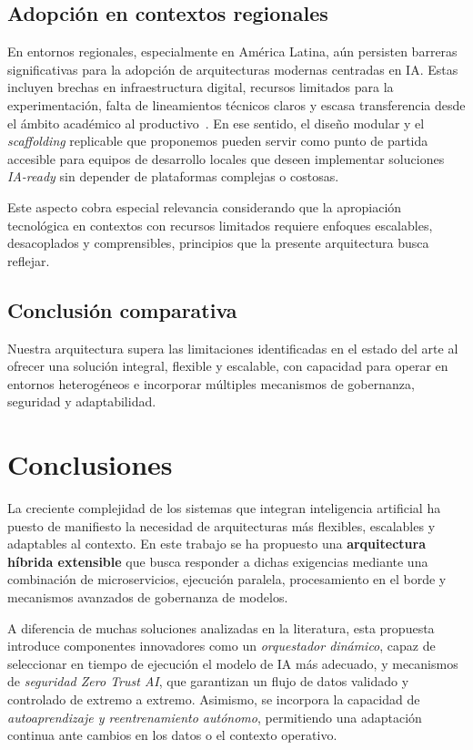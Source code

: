 \documentclass[a4paper]{llncs}
\begin{document}
\subsection{Adopción en contextos regionales}

En entornos regionales, especialmente en América Latina, aún persisten barreras significativas para la adopción de arquitecturas modernas centradas en IA. Estas incluyen brechas en infraestructura digital, recursos limitados para la experimentación, falta de lineamientos técnicos claros y escasa transferencia desde el ámbito académico al productivo~\cite{campos2023artificial}. En ese sentido, el diseño modular y el \emph{scaffolding} replicable que proponemos pueden servir como punto de partida accesible para equipos de desarrollo locales que deseen implementar soluciones \emph{IA-ready} sin depender de plataformas complejas o costosas.

Este aspecto cobra especial relevancia considerando que la apropiación tecnológica en contextos con recursos limitados requiere enfoques escalables, desacoplados y comprensibles, principios que la presente arquitectura busca reflejar.

\subsection{Conclusión comparativa}

Nuestra arquitectura supera las limitaciones identificadas en el estado del arte al ofrecer una solución integral, flexible y escalable, con capacidad para operar en entornos heterogéneos e incorporar múltiples mecanismos de gobernanza, seguridad y adaptabilidad.





\section{Conclusiones}

La creciente complejidad de los sistemas que integran inteligencia artificial ha puesto de manifiesto la necesidad de arquitecturas más flexibles, escalables y adaptables al contexto. En este trabajo se ha propuesto una \textbf{arquitectura híbrida extensible} que busca responder a dichas exigencias mediante una combinación de microservicios, ejecución paralela, procesamiento en el borde y mecanismos avanzados de gobernanza de modelos.

A diferencia de muchas soluciones analizadas en la literatura, esta propuesta introduce componentes innovadores como un \textit{orquestador dinámico}, capaz de seleccionar en tiempo de ejecución el modelo de IA más adecuado, y mecanismos de \textit{seguridad Zero Trust AI}, que garantizan un flujo de datos validado y controlado de extremo a extremo. Asimismo, se incorpora la capacidad de \textit{autoaprendizaje y reentrenamiento autónomo}, permitiendo una adaptación continua ante cambios en los datos o el contexto operativo.
\end{document}
